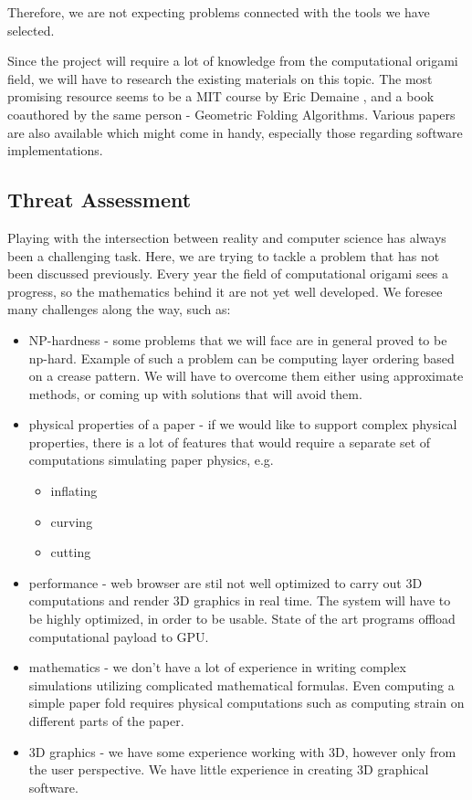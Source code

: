 Therefore, we are not expecting problems connected with the tools we have selected.

Since the project will require a lot of knowledge from the computational origami
field, we will have to research the existing materials on this topic.
The most promising resource seems to be a MIT course by
Eric Demaine \cite{mit-course}, and a book coauthored by the same person -
Geometric Folding Algorithms\cite{origami-book}.
Various papers are also available which might come in handy, especially those regarding software implementations.


\subsection{Threat Assessment}

Playing with the intersection between reality and computer science has always
been a challenging task.
Here, we are trying to tackle a problem that has not been discussed previously.
Every year the field of computational origami sees a progress,
so the mathematics behind it are not yet well developed.
We foresee many challenges along the way, such as:

\begin{itemize}
	\item NP-hardness - some problems that we will face are in general proved to be np-hard.
		Example of such a problem can be computing layer ordering based on a crease pattern.
		We will have to overcome them either using approximate methods, or coming up with solutions that will avoid them.

	\item physical properties of a paper - if we would like to support complex physical properties,
		there is a lot of features that would require a separate set of computations simulating paper physics, e.g.
		\begin{itemize}
			\item inflating
			\item curving 
			\item cutting
		\end{itemize}

	\item performance - web browser are stil not well optimized to carry out 3D computations and render 3D graphics in real time.
		The system will have to be highly optimized, in order to be usable.
		State of the art programs offload computational payload to GPU.

	\item mathematics - we don't have a lot of experience in writing complex simulations utilizing complicated mathematical formulas.
		Even computing a simple paper fold requires physical computations such as computing strain on different parts of the paper.

	\item 3D graphics - we have some experience working with 3D, however only from the user perspective.
		We have little experience in creating 3D graphical software.

\end{itemize}

